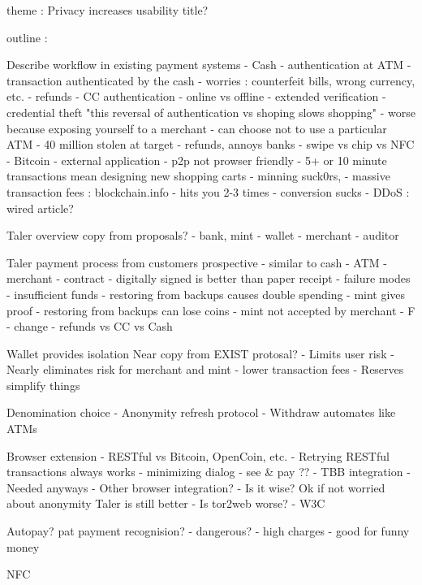 \documentclass[letterpaper,12pt]{article}
\begin{document}
theme : Privacy increases usability
title?

outline : 


Describe workflow in existing payment systems
- Cash
  - authentication at ATM
  - transaction authenticated by the cash
  - worries : counterfeit bills, wrong currency, etc.
  - refunds
- CC authentication 
  - online vs offline
  - extended verification
  - credential theft
  "this reversal of authentication vs shoping slows shopping"
    - worse because exposing yourself to a merchant
    - can choose not to use a particular ATM
    - 40 million stolen at target
  - refunds, annoys banks
  - swipe vs chip vs NFC
- Bitcoin
  - external application
    - p2p not prowser friendly
  - 5+ or 10 minute transactions mean designing new shopping carts
  - minning suck0rs, 
    - massive transaction fees : blockchain.info 
      - hits you 2-3 times
  - conversion sucks
  - DDoS : wired article?


Taler overview
  copy from proposals?
- bank, mint
- wallet
- merchant
- auditor

Taler payment process from customers prospective
- similar to cash 
  - ATM
  - merchant
- contract 
  - digitally signed is better than paper receipt
- failure modes
  - insufficient funds
  - restoring from backups causes double spending
    - mint gives proof
  - restoring from backups can lose coins
  - mint not accepted by merchant
    - F
- change
- refunds
  vs CC
  vs Cash


Wallet provides isolation
  Near copy from EXIST protosal?
- Limits user risk
- Nearly eliminates risk for merchant and mint
  - lower transaction fees
- Reserves simplify things 

Denomination choice
- Anonymity refresh protocol
- Withdraw automates like ATMs

Browser extension
- RESTful vs Bitcoin, OpenCoin, etc.
  - Retrying RESTful transactions always works
- minimizing dialog
- see & pay ??
- TBB integration
  - Needed anyways
- Other browser integration?
  - Is it wise?  Ok if not worried about anonymity  Taler is still better
  - Is tor2web worse? 
- W3C

Autopay?  pat payment recognision?
- dangerous?
- high charges
- good for funny money

NFC
\end{document}
